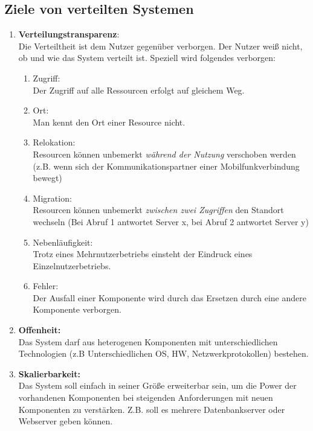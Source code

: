 \subsection{Ziele von verteilten Systemen}
\begin{enumerate}
      \item \textbf{Verteilungstransparenz}:\\
            Die Verteiltheit ist dem Nutzer gegenüber verborgen. Der Nutzer weiß nicht, ob und wie das System verteilt ist. Speziell wird folgendes verborgen:
            \begin{enumerate}
                  \item Zugriff:\\
                        Der Zugriff auf alle Ressourcen erfolgt auf gleichem Weg.
                  \item Ort:\\
                        Man kennt den Ort einer Resource nicht.
                  \item Relokation:\\
                        Resourcen können unbemerkt \textit{während der Nutzung} verschoben werden (z.B. wenn sich der Kommunikationspartner einer Mobilfunkverbindung bewegt)
                  \item Migration:\\
                        Resourcen können unbemerkt \textit{zwischen zwei Zugriffen} den Standort wechseln (Bei Abruf 1 antwortet Server x, bei Abruf 2 antwortet Server y)
                  \item Nebenläufigkeit:\\
                        Trotz eines Mehrnutzerbetriebs einsteht der Eindruck eines Einzelnutzerbetriebs.
                  \item Fehler:\\
                        Der Ausfall einer Komponente wird durch das Ersetzen durch eine andere Komponente verborgen.
            \end{enumerate}
      \item \textbf{Offenheit:}\\
            Das System darf aus heterogenen Komponenten mit unterschiedlichen Technologien (z.B Unterschiedlichen OS, HW, Netzwerkprotokollen) bestehen.
      \item \textbf{Skalierbarkeit:}\\
            Das System soll einfach in seiner Größe erweiterbar sein, um die Power der vorhandenen Komponenten bei steigenden Anforderungen mit neuen Komponenten zu verstärken. Z.B. soll es mehrere Datenbankserver oder Webserver geben können.

\end{enumerate}

